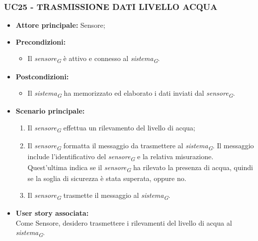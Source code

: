 \subsubsection{UC25 - TRASMISSIONE DATI LIVELLO ACQUA}
\begin{itemize}
    \item \textbf{Attore principale:} Sensore;
    \item \textbf{Precondizioni:}
        \begin{itemize}
            \item Il \textit{sensore}\textsubscript{\textit{G}} è attivo e connesso al \textit{sistema}\textsubscript{\textit{G}}. 
        \end{itemize}
    \item \textbf{Postcondizioni:}
        \begin{itemize}
            \item Il \textit{sistema}\textsubscript{\textit{G}} ha memorizzato ed elaborato i dati inviati dal \textit{sensore}\textsubscript{\textit{G}}.
        \end{itemize}
    \item \textbf{Scenario principale:}
        \begin{enumerate}
            \item Il \textit{sensore}\textsubscript{\textit{G}} effettua un rilevamento del livello di acqua;
            \item Il \textit{sensore}\textsubscript{\textit{G}} formatta il messaggio da trasmettere al \textit{sistema}\textsubscript{\textit{G}}. Il messaggio include l'identificativo del \textit{sensore}\textsubscript{\textit{G}} e la relativa misurazione. Quest'ultima indica se il \textit{sensore}\textsubscript{\textit{G}} ha rilevato la presenza di acqua, quindi se la soglia di sicurezza è stata superata, oppure no.
            \item Il \textit{sensore}\textsubscript{\textit{G}} trasmette il messaggio al \textit{sistema}\textsubscript{\textit{G}}.
        \end{enumerate}
    \item \textbf{User story associata:} \\
    Come Sensore, desidero trasmettere i rilevamenti del livello di acqua al \textit{sistema}\textsubscript{\textit{G}}.
\end{itemize}